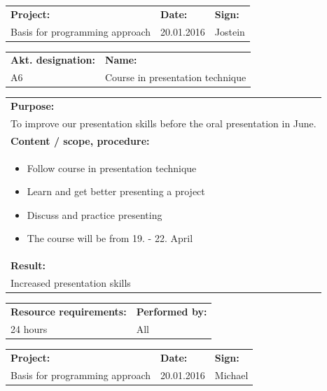 \documentclass[12pt, a4paper]{article}
\begin{document}
\newpage

\begin{tabularx}{\textwidth}{|X|p{32mm}|p{20mm}|}
	\hline
	\textbf{Project:}&\textbf{Date:}&\textbf{Sign:}\\
	Basis for programming approach&20.01.2016&Jostein\\
	\hline
\end{tabularx}

\begin{tabularx}{\textwidth}{|p{40mm}|X|}
	\textbf{Akt. designation:}&\textbf{Name:}\\
	A6&Course in presentation technique  \\
	\hline
\end{tabularx}

\begin{tabularx}{\textwidth}{|X|}
	\textbf{Purpose:}\\
	To improve our presentation skills before the oral presentation in June.\\
	\hline
	\textbf{Content / scope, procedure:}\\
	\begin{itemize}
		\item Follow course in presentation technique
		\item Learn and get better presenting a project
		\item Discuss and practice presenting
		\item The course will be from 19. - 22. April
	\end{itemize}\\
 	\hline
	\textbf{Result:}\\
	Increased presentation skills \\
	\hline
\end{tabularx}

\begin{tabularx}{\textwidth}{|X|p{30mm}|}
	\textbf{Resource requirements:}&\textbf{Performed by:}\\
	24 hours&All\\
	\hline
\end{tabularx}

\newpage

\begin{tabularx}{\textwidth}{|X|p{32mm}|p{20mm}|}
	\hline
	\textbf{Project:}&\textbf{Date:}&\textbf{Sign:}\\
	Basis for programming approach&20.01.2016&Michael\\
	\hline
\end{tabularx}
\end{document}
